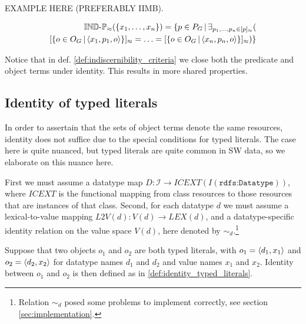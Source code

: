 EXAMPLE HERE (PREFERABLY IIMB).

\begin{definition}
\label{def:indiscernibility_criteria}
\begin{align}
  \indp_{\approx}(\set{\range{x_1}{x_n}})
=
  \setdef{
    p \in P_G
  }{
    \exists_{\range{p_1}{p_n} \in \equivset{p}}(\\
        \equivset{
          \setdef{
            o \in O_G
          }{
            \triple{x_1}{p_1}{o}
          }
        }
      =
        \ldots
      =
        \equivset{
          \setdef{
            o \in O_G
          }{
            \triple{x_n}{p_n}{o}
          }
        }
    )
  }\nonumber
\end{align}
\end{definition}

Notice that in def. \ref{def:indiscernibility_criteria}
  we close both the predicate and object terms under identity.
This results in more shared properties.

\begin{comment}
Drawing:
<s,p,o1>
<s,p,o2>
<o1,=,o2>
From IIMB data.
\end{comment}

\subsection{Identity of typed literals}

In order to assertain that the sets of object terms denote
  the same resources, identity does not suffice due to the special
  conditions for typed literals.
The case here is quite nuanced,
  but typed literals are quite common in SW data,
  so we elaborate on this nuance here.

First we must assume a datatype map
  $D : \mathcal{I} \rightarrow ICEXT(I(\texttt{rdfs:Datatype}))$,
  where $ICEXT$ is the functional mapping from class resources
  to those resources that are instances of that class.
Second, for each datatype $d$ we must assume a lexical-to-value mapping
  $L2V(d) : V(d) \rightarrow LEX(d)$,\cite{Hayes2004}
  and a datatype-specific identity relation on the value space $V(d)$,
  here denoted by $\sim_d$.\footnote{
    Relation $\sim_d$ posed some problems to implement correctly,
    see section \ref{sec:implementation}.}

Suppose that two objects $o_1$ and $o_2$ are both typed literals,
  with $o_1 = \langle d_1,x_1\rangle$ and $o_2 = \langle d_2,x_2\rangle$
  for datatype names $d_1$ and $d_2$ and value names $x_1$ and $x_2$.
Identity between $o_1$ and $o_2$ is then defined as in
  \ref{def:identity_typed_literals}.


